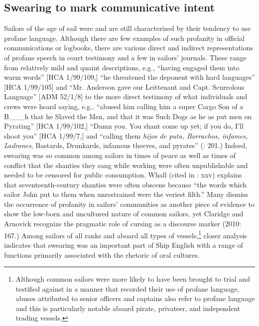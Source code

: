 \subsection{{Swearing} {to} {mark} {communicative} {intent}}%

  Sailors of the age of sail were and are still characterized by their tendency to use profane language. Although there are few examples of such profanity in official communications or logbooks, there are various direct and indirect representations of profane speech in court testimony and a few in sailors’ journals. These range from relatively mild and quaint descriptions, e.g., “having engaged them into warm words” [HCA 1/99/109,] “he threatened the deponent with hard languages” [HCA 1/99/105] and “Mr. Anderson gave our Leittenant and Capt. Scurrolous Language” [ADM 52/1/8] to the more direct testimony of what individuals and crews were heard saying, e.g., “abused him calling him a super Cargo Son of a B\_\_\_h that he Slaved the Men, and that it was Such Dogs as he as put men on Pyrating” [HCA 1/99/102,] “Damn you. You shant come up yet; if you do, I’ll shoot you” [HCA 1/99/7,] and “calling them \textit{hijos de puta, Borrachos, infames, Ladrones}, Bastards, Drunkards, infamous theeves, and pyrates” (\citealt{Gage1648}: 201.) Indeed, swearing was so common among sailors in times of peace as well as times of conflict that the shanties they sang while working were often unpublishable and needed to be censored for public consumption. Whall (cited in \citealt{Palmer1986}: xxv) explains that seventeenth-century shanties were often obscene because “the words which sailor John put to them when unrestrained were the veriest filth.” Many dismiss the occurrence of profanity in sailors’ communities as another piece of evidence to show the low-born and uncultured nature of common sailors, yet Claridge and Arnovick recognize the pragmatic role of cursing as a discourse marker (2010: 167.) Among sailors of all ranks and aboard all types of vessels,\footnote{Although common sailors were more likely to have been brought to trial and testified against in a manner that recorded their use of profane language, abuses attributed to senior officers and captains also refer to profane language and this is particularly notable aboard pirate, privateer, and independent trading vessels.} closer analysis indicates that swearing was an important part of Ship English with a range of functions primarily associated with the rhetoric of oral cultures.

